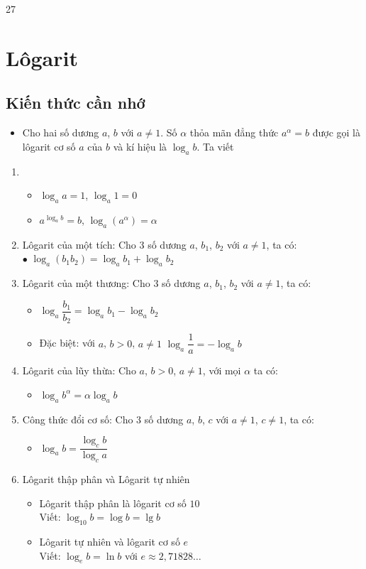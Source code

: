 \setcounter {section} {27}
\setcounter{ex}{0}
\section{Lôgarit}
\subsection{Kiến thức cần nhớ}
\begin{khung}
	\begin{itemize}
		\item Cho hai số dương $a$, $b$ với $a\neq 1$. Số $\alpha$ thỏa mãn đẳng thức $a^\alpha =b$ được gọi là lôgarit cơ số $a$ của $b$ và kí hiệu là $\log_a b$. Ta viết 
	\end{itemize} 
	\begin{enumerate}
		\item
		\begin{itemize}
			\item $\log_a a =1$, $\log_a 1=0$
			\item $a^{\log_a b}=b$, $\log_a (a^\alpha)=\alpha$
		\end{itemize}
		\item Lôgarit của một tích: Cho $3$ số dương $a$, $b_1$, $b_2$ với $a\neq 1$, ta có:\\
		$\bullet$ $\log_a (b_1 b_2)=\log_a b_1 +\log_a b_2$
		\item Lôgarit của một thương: Cho $3$ số dương $a$, $b_1$, $b_2$ với $a\neq 1$, ta có:
		\begin{itemize}
			\item $\log_a \dfrac{b_1}{b_2} =\log_a b_1 -\log_a b_2$
			\item  Đặc biệt: với $a$, $b>0$, $a\neq 1$ $\log_a \dfrac{1}{a}=-\log_a b$
		\end{itemize}
		\item Lôgarit của lũy thừa: Cho $a$, $b>0$, $a\neq 1$, với mọi $\alpha$ ta có:
		\begin{itemize}
			\item $\log_a b^\alpha=\alpha\log_a b$
		\end{itemize}
		\item Công thức đổi cơ số: Cho $3$ số dương $a$, $b$, $c$ với $a\neq 1$, $c\neq 1$, ta có:
		\begin{itemize}
			\item $\log_a b=\dfrac{\log_c b}{\log_c a}$
		\end{itemize}
		\item Lôgarit thập phân và Lôgarit tự nhiên
		\begin{itemize}
			\item Lôgarit thập phân là lôgarit cơ số $10$\\
			Viết: $\log_{10}b=\log b=\lg b$
			\item  Lôgarit tự nhiên và lôgarit cơ số $e$\\
			Viết: $\log_e b=\ln b$ với $e \approx 2{,}71828\ldots$
		\end{itemize}
		
	\end{enumerate}   
\end{khung}
